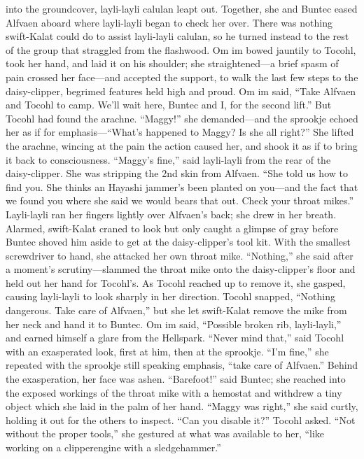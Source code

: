 \documentclass[9pt]{article}
\begin{document}
into the groundcover, layli-layli calulan leapt out. Together, she and Buntec eased Alfvaen aboard
where layli-layli began to check her over.
There was nothing swift-Kalat could do to assist layli-layli calulan, so he turned instead to the rest
of the group that straggled from the flashwood. Om im bowed jauntily to Tocohl, took her hand, and laid
it on his shoulder; she straightened—a brief spasm of pain crossed her face—and accepted the support,
to walk the last few steps to the daisy-clipper, begrimed features held high and proud.
Om im said, “Take Alfvaen and Tocohl to camp. We’ll wait here, Buntec and I, for the second lift.”
But Tocohl had found the arachne. “Maggy!” she demanded—and the sprookje echoed her as if for
emphasis—“What’s happened to Maggy? Is she all right?” She lifted the arachne, wincing at the pain the
action caused her, and shook it as if to bring it back to consciousness.
“Maggy’s fine,” said layli-layli from the rear of the daisy-clipper. She was stripping the 2nd skin
from Alfvaen. “She told us how to find you. She thinks an Hayashi jammer’s been planted on you—and
the fact that we found you where she said we would bears that out. Check your throat mikes.”
Layli-layli ran her fingers lightly over Alfvaen’s back; she drew in her breath.
Alarmed, swift-Kalat craned to look but only caught a glimpse of gray before Buntec shoved him
aside to get at the daisy-clipper’s tool kit. With the smallest screwdriver to hand, she attacked her own
throat mike. “Nothing,” she said after a moment’s scrutiny—slammed the throat mike onto the
daisy-clipper’s floor and held out her hand for Tocohl’s.
As Tocohl reached up to remove it, she gasped, causing layli-layli to look sharply in her direction.
Tocohl snapped, “Nothing dangerous. Take care of Alfvaen,” but she let swift-Kalat remove the mike
from her neck and hand it to Buntec.
Om im said, “Possible broken rib, layli-layli,” and earned himself a glare from the Hellspark.
“Never mind that,” said Tocohl with an exasperated look, first at him, then at the sprookje. “I’m
fine,” she repeated with the sprookje still speaking emphasis, “take care of Alfvaen.” Behind the
exasperation, her face was ashen.
“Barefoot!” said Buntec; she reached into the exposed workings of the throat mike with a hemostat
and withdrew a tiny object which she laid in the palm of her hand. “Maggy was right,” she said curtly,
holding it out for the others to inspect.
“Can you disable it?” Tocohl asked.
“Not without the proper tools,” she gestured at what was available to her, “like working on a clipperengine with a sledgehammer.”
\end{document}
